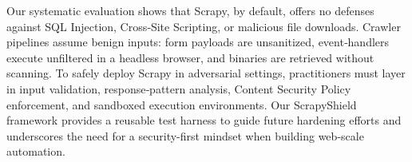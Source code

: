 

Our systematic evaluation shows that Scrapy, by default, offers no defenses against SQL Injection, Cross‐Site Scripting, or malicious file downloads. Crawler pipelines assume benign inputs: form payloads are unsanitized, event‐handlers execute unfiltered in a headless browser, and binaries are retrieved without scanning. To safely deploy Scrapy in adversarial settings, practitioners must layer in input validation, response‐pattern analysis, Content Security Policy enforcement, and sandboxed execution environments. Our ScrapyShield framework provides a reusable test harness to guide future hardening efforts and underscores the need for a security-first mindset when building web‐scale automation.
